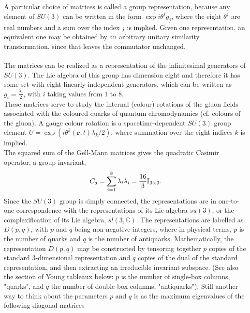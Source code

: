 \\
\\
A particular choice of matrices is called a group representation, because any element of $SU(3)$ can be written in the form $\exp{i\theta ^{j}g_{j}}$, where the eight $\theta^j$ are real numbers and a sum over the index $j$ is implied. Given one representation, an equivalent one may be obtained by an arbitrary unitary similarity transformation, since that leaves the commutator unchanged.\\
\\
The matrices can be realized as a representation of the infinitesimal generators of $SU(3)$. The Lie algebra of this group has dimension eight and therefore it has some set with eight linearly independent generators, which can be written as $g_i=\frac{\lambda_i}{2}$, with $i$ taking values from $1$ to $8$.\\
These matrices serve to study the internal (colour) rotations of the gluon fields associated with the coloured quarks of quantum chromodynamics (cf. colours of the gluon). A gauge colour rotation is a spacetime-dependent $SU(3)$ group element $U=\exp(i \theta^k(\mathbf{r},t) \lambda_k/2)$, where summation over the eight indices $k$ is implied.
\\
The squared sum of the Gell-Mann matrices gives the quadratic Casimir operator, a group invariant,
 \begin{equation}
 	C_d = \sum_{i=1}^8 \lambda_i \lambda_i = \frac{16}{3}\mathbb{I}_{3\times 3}.
 \end{equation}
Since the $SU(3)$ group is simply connected, the representations are in one-to-one correspondence with the representations of its Lie algebra $su(3)$, or the complexification of its Lie algebra, $sl(3,\mathbb{C})$. The representations are labelled as $D(p,q)$, with $p$ and $q$ being non-negative integers, where in physical terms, $p$ is the number of quarks and $q$ is the number of antiquarks. Mathematically, the representation $D(p,q)$ may be constructed by tensoring together $p$ copies of the standard $3$-dimensional representation and $q$ copies of the dual of the standard representation, and then extracting an irreducible invariant subspace. (See also the section of Young tableaux below: $p$ is the number of single-box columns, "quarks", and $q$ the number of double-box columns, "antiquarks"). Still another way to think about the parameters $p$ and $q$ is as the maximum eigenvalues of the following diagonal matrices
